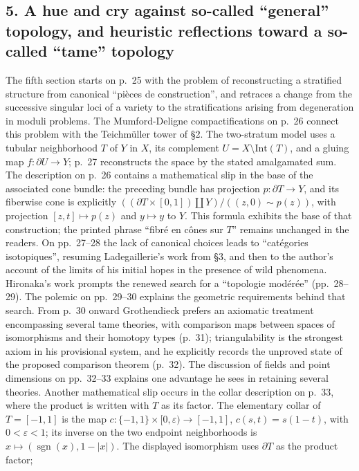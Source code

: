 \documentclass[11pt,a4paper]{article}
\begin{document}
\subsection*{5. A hue and cry against so-called ``general'' topology, and heuristic reflections toward a so-called ``tame'' topology}
The fifth section starts on p.~25 with the problem of reconstructing a
stratified structure from canonical ``pièces de construction'', and
retraces a change from the successive singular loci of a variety to the
stratifications arising from degeneration in moduli problems. The
Mumford-Deligne compactifications on p.~26 connect this problem with the
Teichmüller tower of \S2. The two-stratum model uses a tubular neighborhood
$T$ of $Y$ in $X$, its complement $U=X\setminus\mathrm{Int}(T)$, and a
gluing map $f:\partial U\longrightarrow Y$; p.~27 reconstructs the space
by the stated amalgamated sum. The description on p.~26 contains a
mathematical slip in the base of the associated cone bundle: the preceding
bundle has projection $p:\partial T\longrightarrow Y$, and its fiberwise
cone is explicitly
$((\partial T\times[0,1])\amalg Y)/((z,0)\sim p(z))$,
with projection $[z,t]\mapsto p(z)$ and $y\mapsto y$ to $Y$.
This formula exhibits the base of that construction; the printed phrase
``fibré en cônes sur $T$'' remains unchanged in the readers. On pp.~27--28
the lack of canonical choices leads to ``catégories isotopiques'',
resuming Ladegaillerie's work from \S3, and then to the author's account
of the limits of his initial hopes in the presence of wild phenomena.
Hironaka's work prompts the renewed search for a ``topologie modérée''
(pp.~28--29). The polemic on pp.~29--30 explains the geometric
requirements behind that search. From p.~30 onward Grothendieck prefers
an axiomatic treatment encompassing several tame theories, with
comparison maps between spaces of isomorphisms and their homotopy types
(p.~31); triangulability is the strongest axiom in his provisional system,
and he explicitly records the unproved state of the proposed comparison
theorem (p.~32). The discussion of fields and point dimensions on
pp.~32--33 explains one advantage he sees in retaining several theories.
Another mathematical slip occurs in the collar description on p.~33,
where the product is written with $T$ as its factor. The elementary collar
of $T=[-1,1]$ is the map
$c:\{-1,1\}\times[0,\varepsilon)\longrightarrow[-1,1]$,
$c(s,t)=s(1-t)$, with $0<\varepsilon<1$; its inverse on the two endpoint
neighborhoods is $x\mapsto(\operatorname{sgn}(x),1-|x|)$.
The displayed isomorphism uses $\partial T$ as the product factor;
\end{document}
